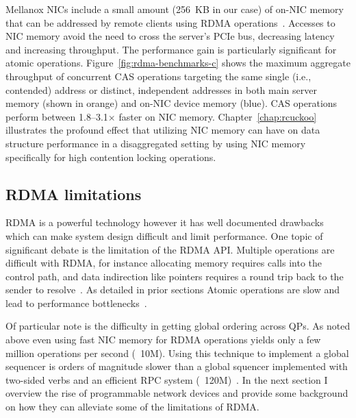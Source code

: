 \documentclass[12pt]{ucsddissertation}
\begin{document}

Mellanox NICs include a small amount (256~KB in our case) of on-NIC memory that can be addressed by
remote clients using RDMA operations~\cite{device-memory}.  Accesses to NIC memory avoid the need to
cross the server's PCIe bus, decreasing latency and increasing throughput.  The performance gain is
particularly significant for atomic operations.  Figure~\ref{fig:rdma-benchmarks-c} shows the
maximum aggregate throughput of concurrent CAS operations targeting the same single (i.e.,
contended) address or distinct, independent addresses in both main server memory (shown in orange)
and on-NIC device memory (blue).  CAS operations perform between 1.8--3.1$\times$ faster on NIC
memory.  
Chapter~\ref{chap:rcuckoo} illustrates the profound effect that utilizing NIC memory can have on
data structure performance in a disaggregated setting by using NIC memory specifically for high
contention locking operations.

\subsection{RDMA limitations}

RDMA is a powerful technology however it has well documented drawbacks which can make system design
difficult and limit performance. One topic of significant debate is the limitation of the RDMA API.
Multiple operations are difficult with RDMA, for instance allocating memory requires calls into the
control path, and data indirection like pointers requires a round trip back to the sender to
resolve~\cite{prism}. As detailed in prior sections Atomic operations are slow and lead to
performance bottlenecks~\cite{design-guidelines}.

Of particular note is the difficulty in getting global ordering across QPs. As noted above even
using fast NIC memory for RDMA operations yields only a few million operations per second (~10M).
Using this technique to implement a global sequencer is orders of magnitude slower than a global
squencer implemented with two-sided verbs and an efficient RPC system
(~120M)~\cite{design-guidelines}. In the next section I overview the rise of programmable network
devices and provide some background on how they can alleviate some of the limitations of RDMA.


\end{document}
